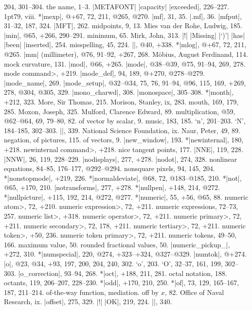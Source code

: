  204, 301--304.
\sub the name, 1--3.
|METAFONT| |capacity| |exceeded|, 226--227.
\MF\kern1pt79, viii.
*|mexp|, @+67, 72, 211, @265, @270.
|mf|, 31, 35.
|.mf|, 36.
|mfput|, 31--32, 187, 324.
|MFT|, 262.
midpoints, 9, 13.
Mies van der Rohe, Ludwig, 185.
|min|, @65, +266, 290--291.
minimum, 65.
Mirk, John, 313.
|!| |Missing| |`)'| |has| |been| |inserted|, 254.
misspelling, 45, 224.
|\mixture|, @40, +338.
*|mlog|, @+67, 72, 211, @265.
|mm| (millimeter), @76, 91--92, +267, 268.
M\"obius, August Ferdinand, 114.
mock curvature, 131.
|mod|, @66, +265.
|mode|, @38--@39, @75, 91--94, 269, 278.
\<mode command>, +219.
|mode_def|, 94, 189, @+270, @278--@279.
|mode_name|, 269.
|mode_setup|, @32--@34, 75, 76, 91--94, @96, 115, 169, +269, 278, @304, @305,
 329.
|mono_charwd|, 308.
|monospace|, 305--308.
*|month|, +212, 323.
More, Sir Thomas, 215.
Morison, Stanley, ix, 283.
mouth, 169, 179, 285.
Moxon, Joseph, 325.
Mulford, Clarence Edward, 89.
multiplication, @59, @62--@64, 69, 79--80, 82.
\sub of vector by scalar, 9.
music, 183, 185.
\newletter
`n', 201--203.
`N', 184--185, 302--303.
|\names|, 339.
National Science Foundation, ix.
Naur, Peter, 49, 89.
negation, of pictures, 115.
\sub of vectors, 9.
|new_window|, 193.
*|newinternal|, 180, +218.
\<newinternal command>, +218.
nice tangent points, 177.
|NNE|, 119, 228.
|NNW|, 26, 119, 228--229.
|nodisplays|, 277, +278.
|nodot|, 274, 328.
nonlinear equations, 84--85, 176--177, @292--@294.
nonsquare pixels, 94, 145, 204.
*|nonstopmode|, +219, 226.
*|normaldeviate|, @68, 72, @183--@185, 210.
*|not|, @65, +170, 210.
|notransforms|, 277, +278.
*|nullpen|, +148, 214, @272.
*|nullpicture|, +115, 192, 214, @272, @277.
*|numeric|, 55, +56, @65, 88.
\<numeric atom>, 72, +210.
\<numeric expression>, 72, +211.
numeric expressions, 72--73, 257.
\<numeric list>, +318.
\<numeric operator>, 72, +211.
\<numeric primary>, 72, +211.
\<numeric secondary>, 72, 178, +211.
\<numeric tertiary>, 72, +211.
\<numeric token>, +50, 236.
\<numeric token primary>, 72, +211.
numeric tokens, 49--50, 166.
\sub maximum value, 50.
\sub rounded fractional values, 50.
|numeric_pickup_|, +272, 310.
*|numspecial|, 220, @274, +323--+324, @327--@329.
|numtok|, @+274.
\newletter
|o|, @23, @34, +93, 197, 200, 204, 240, 302.
`o', 203.
`O', 32--37, 161, 199, 302--303.
|o_correction|, 93--94, 268.
*|oct|, +188, 211, 281.
octal notation, 188.
octants, 119, 206--207, 228--230.
*|odd|, +170, 210, 250.
*|of|, 73, 129, 165--167, 187, 211--214.
of-the-way function, \see mediation.
off by $x$, 82.
Office of Naval Research, ix.
|offset|, 275, 329.
|!| |OK|, 219, 224.
|\omitaccents|, 340.
